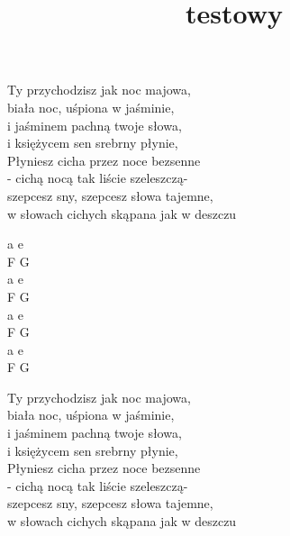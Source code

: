 \documentclass[11pt,twocolumn]{article}
\title{testowy}
\begin{document}
        \begin{minipage}{0.6\textwidth}
            \noindent Ty przychodzisz jak noc majowa,\\
            biała noc, uśpiona w jaśminie,\\
            i jaśminem pachną twoje słowa,\\
            i księżycem sen srebrny płynie,\\
            \hfill\break
            Płyniesz cicha przez noce bezsenne\\
            - cichą nocą tak liście szeleszczą-\\
            szepcesz sny, szepcesz słowa tajemne,\\
            w słowach cichych skąpana jak w deszczu\\
        \end{minipage}
        \begin{minipage}{0.1\textwidth}
            \ifchorded
            \noindent a e\\
            F G\\
            a e\\
            F G\\
            \hfill\break
            a e\\
            F G\\
            a e\\
            F G\\
            \else
            \fi
        \end{minipage}
    \columnbreak
        \begin{minipage}{0.6\textwidth}
            \noindent Ty przychodzisz jak noc majowa,\\
            biała noc, uśpiona w jaśminie,\\
            i jaśminem pachną twoje słowa,\\
            i księżycem sen srebrny płynie,\\
            \hfill\break
            Płyniesz cicha przez noce bezsenne\\
            - cichą nocą tak liście szeleszczą-\\
            szepcesz sny, szepcesz słowa tajemne,\\
            w słowach cichych skąpana jak w deszczu\\
            \vfill\null
        \end{minipage}
\end{document}

